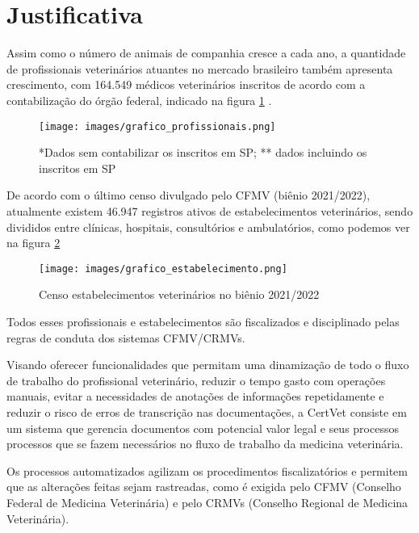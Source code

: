 \documentclass[
    12pt,               %
    openright,          %
    oneside,
    a4paper,            %
    MODELO,             %
    TODO,               %
    english,            %
    brazil              %
    ]{ifsp-spo-inf-ctds}
\begin{document}
    \section{Justificativa}

    Assim como o número de animais de companhia cresce a cada ano, a quantidade de profissionais veterinários atuantes no mercado brasileiro também apresenta crescimento, com 164.549 médicos veterinários inscritos de acordo com a contabilização do órgão federal, indicado na figura \ref{fig:grafico vet} \cite{vets_SP, vets2020, vets2022}.
    
    \begin{figure}[H]
        \centering
        \texttt{[image: images/grafico\_profissionais.png]}
        \caption{*Dados sem contabilizar os inscritos em SP; ** dados incluindo os inscritos em SP\cite{vets2020,vets2022} }
        \label{fig:grafico vet}
    \end{figure}
    
    De acordo com o último censo divulgado pelo CFMV (biênio 2021/2022), atualmente existem 46.947 registros ativos de estabelecimentos veterinários, sendo divididos entre clínicas, hospitais, consultórios e ambulatórios, como podemos ver na figura \ref{fig:grafico clinicas} \cite{clinicas2022}
    
    \begin{figure}[H]
        \centering
        \texttt{[image: images/grafico\_estabelecimento.png]}
        \caption{Censo estabelecimentos veterinários no biênio 2021/2022\cite{clinicas2022}}
        \label{fig:grafico clinicas}
    \end{figure}
    
    Todos esses profissionais e estabelecimentos são fiscalizados e disciplinado pelas regras de conduta dos sistemas CFMV/CRMVs.
    
    Visando oferecer funcionalidades que permitam uma dinamização de todo o fluxo de trabalho do profissional veterinário, reduzir o tempo gasto com operações manuais, evitar a necessidades de anotações de informações repetidamente e reduzir o risco de erros de transcrição nas documentações, a CertVet consiste em um sistema que gerencia documentos com potencial valor legal e seus processos processos que se fazem necessários no fluxo de trabalho da medicina veterinária.
    
    Os processos automatizados agilizam os procedimentos fiscalizatórios e permitem que as alterações feitas sejam rastreadas, como é exigida pelo CFMV (Conselho Federal de Medicina Veterinária) e pelo CRMVs (Conselho Regional de Medicina Veterinária)\cite{teleMV}.
    
\end{document}
